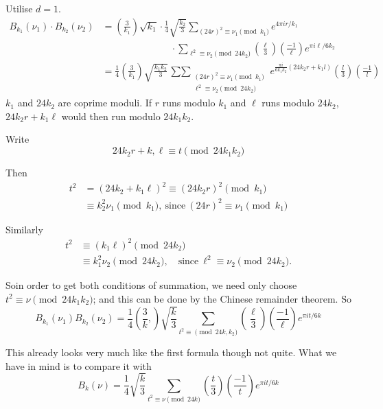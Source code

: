 \setcounter{case}{0}
\begin{case}\label{part3:lec26:case1}
  Utilise $d=1$.
  \begin{align*}
    B_{k_1} (\nu_1) \cdot B_{k_2} (\nu_2) & = \left(
    \frac{3}{k_1}\right) \sqrt{k_1} \cdot \frac{1}{4} \sqrt{\frac{k_2}{3}}
    \sum_{(24 r)^2 \equiv \nu_1 \pmod{k_1}} e^{4 \pi i r/k_1}\\ 
    & \hspace{3cm} \cdot
    \sum_{\ell^2 \equiv \nu_2 \pmod{24 k_2}} \left(
    \frac{\ell}{3}\right) \left( \frac{-1}{\ell}\right) e^{\pi i
      \ell/6 k_2}\\
    & = \frac{1}{4} \left( \frac{3}{k_1}\right) \sqrt{\frac{k_1
        k_2}{3}}  \mathop{\sum\sum}_{\substack{(24r)^2\equiv \nu_1
    \pmod{k_1}\\ \ell^2 \equiv \nu_2 \pmod{24 k_2}}} e^{\frac{\pi
        i}{6k_1 k_2} (24 k_2 r+ k_1 l)} \left(\frac{l}{3}\right) \left(
      \frac{-1}{l}\right)
  \end{align*}
  $k_1$ and $24 k_2$ are coprime moduli. If $r$ runs modulo $k_1$ and
  $\ell$ runs modulo $24 k_2$, $24 k_2 r+k_1 \ell$ would then run
  modulo $24 k_1 k_2$.
\end{case}

Write
$$
24 k_2 r + k, \ell \equiv t \pmod{24 k_1 k_2}
$$

Then 
\begin{align*}
  t^2 & = (24 k_2 + k_1 \ell)^2 \equiv (24 k_2 r)^2 \pmod{k_1}\\
  & \equiv k^2_2 \nu_1 \pmod{k_1}, ~\text{since}~ (24 r)^2 \equiv
  \nu_1 \pmod{k_1}
\end{align*}

Similarly
\begin{align*}
  t^2 & \equiv (k_1 \ell)^2 \pmod{24 k_2}\\
  & \equiv k_1^2 \nu_2 \pmod{24 k_2}, \quad \text{since}~\ell^2 \equiv \nu_2
  \pmod{24 k_2}.
\end{align*}

So\pageoriginale in order to get both conditions of summation, we need only choose
$t^2 \equiv \nu \pmod{24k_1 k_2}$; and this can be done by the Chinese
remainder theorem. So
$$
B_{k_1} (\nu_1) B_{k_2} (\nu_2) = \frac{1}{4} \left(\frac{3}{k},
\right) \sqrt{\frac{k}{3}}  \sum_{t^2 \equiv \pmod{24 k, k_2}}
\left( \frac{\ell}{3}\right) \left( \frac{-1}{\ell}\right) e^{\pi i t/
6k} 
$$

This already looks very much like the first formula though not
quite. What we have in mind is to compare it with
$$
B_k (\nu) = \frac{1}{4} \sqrt{\frac{k}{3}} \sum_{t^2 \equiv \nu
  \pmod{24 k}} \left(
  \frac{t}{3}\right)\left( \frac{-1}{t}\right) e^{\pi i t/6k}  
$$

